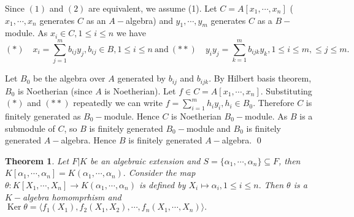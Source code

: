 \documentclass[11pt]{amsart}
\newtheorem{theorem}{Theorem}[section]
\newcommand{\gen}[1]{\langle#1\rangle}
\DeclareMathOperator{\Ker}{\text{Ker}}
\begin{document}
\proof Since $(1)$ and $(2)$ are equivalent, we assume (1). Let $C=A[x_1,\cdots,x_n]$ ($x_1,\cdots,x_n$ generates $C$ as an $A-$algebra) and $y_1,\cdots,y_m$ generates $C$ as a $B-$module. As $x_i\in C,1\leq i\leq n$ we have $$(*)\quad x_i=\sum_{j=1}^m b_{ij}y_j,b_{ij}\in B,1\leq i\leq n~\text{and}~(**)\quad y_iy_j=\sum_{k=1}^m b_{ijk}y_k,1\leq i\leq m,\leq j\leq m.$$

Let $B_0$ be the algebra over $A$ generated by $b_{ij}$ and $b_{ijk}$. By Hilbert basis theorem, $B_0$ is Noetherian (since $A$ is Noetherian). Let $f\in C=A[x_1,\cdots,x_n].$ Substituting $(*)$ and $(**)$ repeatedly we can write $f=\displaystyle\sum_{i=1}^m h_iy_i,h_i\in B_0.$ Therefore $C$ is finitely generated as $B_0-$module. Hence $C$ is Noetherian $B_0-$module. As $B$ is a submodule of $C$, so $B$ is finitely generated $B_0-$module and $B_0$ is finitely generated $A-$algebra. Hence $B$ is finitely generated $A-$algebra. \qed


\begin{theorem}

Let $F|K$ be an algebraic extension and $S=\{\alpha_1,\cdots,\alpha_n\}\subseteq F$, then $K[\alpha_1,\cdots,\alpha_n]=K(\alpha_1,\cdots,\alpha_n).$ Consider the map $\theta:K[X_1,\cdots,X_n]\to K(\alpha_1,\cdots,\alpha_n)$ is defined by $X_i\mapsto \alpha_i,1\leq i\leq n.$ Then $\theta$ is a $K-$algebra homomprhism and $\Ker\theta=\gen{f_1(X_1),f_2(X_1,X_2),\cdots,f_n(X_1,\cdots,X_n)}.$

\end{theorem}
\end{document}

